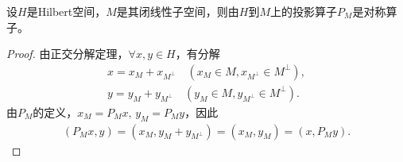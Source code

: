\documentclass[../../main.tex]{subfiles}%
\begin{document}
\begin{examples}
设$H$是Hilbert空间，$M$是其闭线性子空间，则由$H$到$M$上的投影算子$P_M$是对称算子。
\end{examples}
\begin{proof}

由正交分解定理，$\forall x,y\in H$，有分解
\begin{align*}
x=x_M+x_{M^\perp}\quad(x_M\in M,x_{M^\perp}\in M^\perp),\\
y=y_M+y_{M^\perp}\quad(y_M\in M,y_{M^\perp}\in M^\perp).
\end{align*}
由$P_M$的定义，$x_M=P_Mx,\,y_M=P_My$，因此
\begin{align*}
(P_Mx,y)=(x_M,y_M+y_{M^\perp})=(x_M,y_M)=(x,P_My).
\end{align*}

\end{proof}
\end{document}
